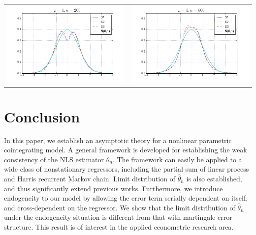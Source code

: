 \begin{table}[!ht]
{\begin{tabular}{c c}
\includegraphics[width=8cm]{t_ratio_200_1} & \includegraphics[width=8cm]{t_ratio_500_1} \\
\end{tabular}
}
\end{table}

\section{Conclusion}

In this paper, we establish an asymptotic theory for a nonlinear parametric cointegrating model. A general framework is developed for establishing the weak consistency of the NLS estimator $\hat{\theta}_n$. The framework can easily be applied to a wide class of nonstationary regressors, including the partial sum of linear process and Harris recurrent Markov chain. Limit distribution of $\hat{\theta}_n$ is also established, and thus significantly extend previous works. Furthermore, we introduce endogeneity to our model by allowing the error term serially dependent on itself, and cross-dependent on the regressor. We show that the limit distribution of $\hat{\theta}_n$ under the endogeneity situation is different from that with martingale error structure. This result is of interest in the applied econometric research area.


